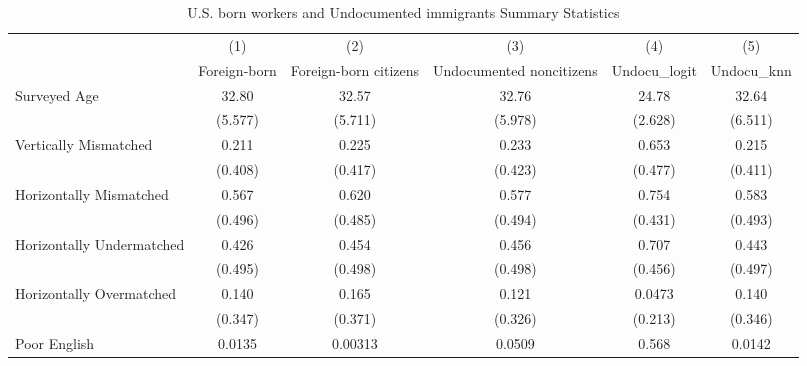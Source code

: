 \begin{table}[htbp]\centering
\def\sym#1{\ifmmode^{#1}\else\(^{#1}\)\fi}
\caption{U.S. born workers and Undocumented immigrants Summary Statistics \label{tab:sum}}
\begin{tabular}{l*{5}{c}}
\hline\hline
                    &\multicolumn{1}{c}{(1)}         &\multicolumn{1}{c}{(2)}         &\multicolumn{1}{c}{(3)}         &\multicolumn{1}{c}{(4)}         &\multicolumn{1}{c}{(5)}         \\
                    &Foreign-born         &Foreign-born citizens         &Undocumented noncitizens         &Undocu\_logit         &  Undocu\_knn         \\
\hline
Surveyed Age        &       32.80         &       32.57         &       32.76         &       24.78         &       32.64         \\
                    &     (5.577)         &     (5.711)         &     (5.978)         &     (2.628)         &     (6.511)         \\
[1em]
Vertically Mismatched&       0.211         &       0.225         &       0.233         &       0.653         &       0.215         \\
                    &     (0.408)         &     (0.417)         &     (0.423)         &     (0.477)         &     (0.411)         \\
[1em]
Horizontally Mismatched&       0.567         &       0.620         &       0.577         &       0.754         &       0.583         \\
                    &     (0.496)         &     (0.485)         &     (0.494)         &     (0.431)         &     (0.493)         \\
[1em]
Horizontally Undermatched&       0.426         &       0.454         &       0.456         &       0.707         &       0.443         \\
                    &     (0.495)         &     (0.498)         &     (0.498)         &     (0.456)         &     (0.497)         \\
[1em]
Horizontally Overmatched&       0.140         &       0.165         &       0.121         &      0.0473         &       0.140         \\
                    &     (0.347)         &     (0.371)         &     (0.326)         &     (0.213)         &     (0.346)         \\
[1em]
Poor English        &      0.0135         &     0.00313         &      0.0509         &       0.568         &      0.0142         \\

\end{tabular}
\end{table}
